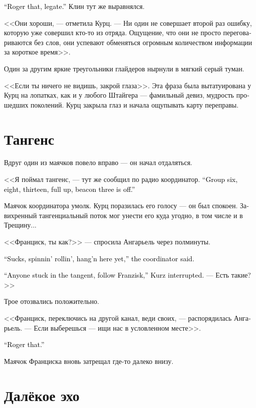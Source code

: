 \documentclass[a4paper,12pt,fleqn]{book}\usepackage{cooltooltips}\usepackage{polyglossia}\setdefaultlanguage[babelshorthands=true]{russian}\setotherlanguage{english}\defaultfontfeatures{Ligatures=TeX,Mapping=tex-text} \usepackage{xcolor}\definecolor{lightgray}{HTML}{bbbbbb}\color{lightgray}\newcommand{\ml}[3]{\textenglish{\textcolor{black}{#3}}}
\begin{document}
\ml{$0$}
{<<Понял, легат>>.}
{``Roger that, legate.''}
Клин тут же выравнялся.

<<Они хороши, --- отметила Курц.
--- Ни один не совершает второй раз ошибку, которую уже совершил кто-то из отряда.
Ощущение, что они не просто переговариваются без слов, они успевают обменяться огромным количеством информации за короткое время>>.

Один за другим яркие треугольники глайдеров нырнули в мягкий серый туман.

<<Если ты ничего не видишь, закрой глаза>>.
Эта фраза была вытатуирована у Курц на лопатках, как и у любого Штайгера --- фамильный девиз, мудрость прошедших поколений.
Курц закрыла глаз и начала ощупывать карту переправы.

\section{Тангенс}

Вдруг один из маячков повело вправо --- он начал отдаляться.

<<Я поймал тангенс, --- тут же сообщил по радио координатор.
\ml{$0$}
{--- Шестая, восьмая, тринадцатая группа --- вверх до упора, ориентир три --- отбой>>.}
{``Group six, eight, thirteen, full up, beacon three is off.''}

Маячок координатора умолк.
Курц поразилась его голосу --- он был спокоен.
Завихренный тангенциальный поток мог унести его куда угодно, в том числе и в Трещину...

<<Франциск, ты как?>> --- спросила Ангарьель через полминуты.

\ml{$0$}
{<<Паршиво, крутит, но держусь>>, --- сообщил координатор.}
{``Sucks, spinnin' rollin', hang'n here yet,'' the coordinator said.}

\ml{$0$}
{<<Если кто-то увяз в тангенсе, следуйте за Франциском, --- вмешалась Курц.}
{``Anyone stuck in the tangent, follow Franzisk,'' Kurz interrupted.}
--- Есть такие?>>

Трое отозвались положительно.

<<Франциск, переключись на другой канал, веди своих, --- распорядилась Ангарьель.
--- Если выберешься --- ищи нас в условленном месте>>.

\ml{$0$}
{<<Понял>>.}
{``Roger that.''}

Маячок Франциска вновь затрещал где-то далеко внизу.

\section{Далёкое эхо}
\end{document}
